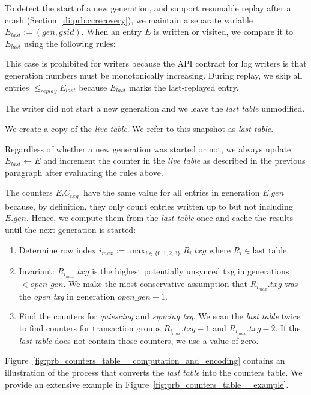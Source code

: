 \documentclass[12pt,a4paper,twoside]{book}
\begin{document}
To detect the start of a new generation, and support resumable replay after a crash (Section~\ref{di:prb:ccrecovery}), we maintain a separate variable $E_{last} := (gen, gsid)$.
When an entry $E$ is written or visited, we compare it to $E_{last}$ using the following rules:
\begin{description}[noitemsep,leftmargin=1.5cm,labelindent=1cm]
\item[$E < E_{last}$] This case is prohibited for writers because the API contract for log writers is that generation numbers must be monotonically increasing.
  During replay, we skip all entries $\le_{replay} E_{last}$ because $E_{last}$ marks the last-replayed entry.
\item[$E.gen = E_{last}.gen$] The writer did not start a new generation and we leave the \textit{last table} unmodified.
\item[$E.gen > E_{last}.gen$] We create a copy of the \textit{live table}. We refer to this snapshot as \textit{last table}.
\end{description}
Regardless of whether a new generation was started or not, we always update $E_{last} \leftarrow E$ and increment the counter in the \textit{live table} as described in the previous paragraph after evaluating the rules above.

The counters $E.C_{txg_i}$ have the same value for all entries in generation $E.gen$  because, by definition, they only count entries written up to but not including $E.gen$.
Hence, we compute them from the \textit{last table} once and cache the results until the next generation is started:
\begin{enumerate}[noitemsep]
    \item Determine row index $i_{max} := \max_{i \in \{0,1,2,3\}} R_i.txg$ where $R_i \in \text{last table}$.
    \item Invariant: $R_{i_{max}}.txg$ is the highest potentially unsynced txg in generations $< open\_gen$.
        We make the most conservative assumption that $R_{i_{max}}.txg$ was the \textit{open txg} in generation $open\_gen - 1$.
    \item Find the counters for \textit{quiescing} and \textit{syncing txg}.
        We scan the \textit{last table} twice to find counters for transaction groups $R_{i_{max}}.txg - 1$ and $R_{i_{max}}.txg - 2$.
        If the \textit{last table} does not contain those counters, we use a value of zero.
\end{enumerate}

Figure~\ref{fig:prb_counters_table__computation_and_encoding} contains an illustration of the process that converts the \textit{last table} into the counters table.
We provide an extensive example in Figure~\ref{fig:prb_counters_table__example}.
\end{document}
